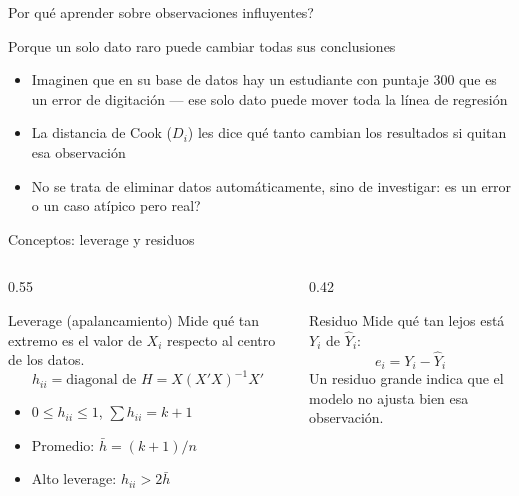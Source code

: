\documentclass[aspectratio=169, 11pt]{beamer}
\begin{document}
\begin{frame}{\textquestiondown{}Por qu\'e aprender sobre observaciones influyentes?}
\begin{exampleblock}{Porque un solo dato raro puede cambiar todas sus conclusiones}
\small
\begin{itemize}\setlength{\itemsep}{2pt}
  \item Imaginen que en su base de datos hay un estudiante con puntaje 300 que es un error de digitaci\'on --- ese solo dato puede mover toda la l\'inea de regresi\'on
  \item La distancia de Cook ($D_i$) les dice qu\'e tanto cambian los resultados si quitan esa observaci\'on
  \item No se trata de eliminar datos autom\'aticamente, sino de investigar: \textquestiondown{}es un error o un caso at\'ipico pero real?
\end{itemize}
\end{exampleblock}
\end{frame}

\begin{frame}{Conceptos: leverage y residuos}
\begin{columns}
\begin{column}{0.55\textwidth}
\begin{block}{Leverage (apalancamiento)}
Mide qué tan extremo es el valor de $X_i$ respecto al centro de los datos.
$$h_{ii} = \text{diagonal de } H = X(X'X)^{-1}X'$$
\begin{itemize}
\item $0 \leq h_{ii} \leq 1$, \; $\sum h_{ii} = k+1$
\item Promedio: $\bar{h} = (k+1)/n$
\item Alto leverage: $h_{ii} > 2\bar{h}$
\end{itemize}
\end{block}
\end{column}

\begin{column}{0.42\textwidth}
\begin{block}{Residuo}
Mide qué tan lejos está $Y_i$ de $\hat{Y}_i$:
$$e_i = Y_i - \hat{Y}_i$$
Un residuo grande indica que el modelo no ajusta bien esa observación.
\end{block}
\end{column}
\end{columns}
\end{frame}
\end{document}
